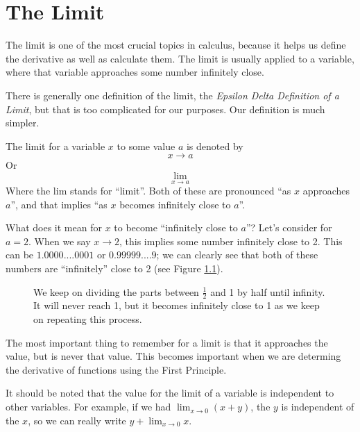 \documentclass[working]{tuftebook}
\begin{document}
\chapter{The Limit}
\vspace{-2em}
The limit is one of the most crucial topics in calculus, because it helps us define the derivative as well as calculate them. The limit is usually applied to a variable, where that variable approaches some number infinitely close.

There is generally one definition of the limit, the \emph{Epsilon Delta Definition of a Limit}, but that is too complicated for our purposes. Our definition is much simpler.

\begin{definition}
    The limit for a variable $x$ to some value $a$ is denoted by 
    \[
        x\to a
    \]
    Or
    \[
        \lim_{x\to a}
    \]
    Where the lim stands for ``limit''. Both of these are pronounced ``as $x$ approaches $a$'', and that implies ``as $x$ becomes infinitely close to $a$''.
\end{definition}

What does it mean for $x$ to become ``infinitely close to $a$''? Let's consider for $a=2$. When we say $x\to 2$, this implies some number infinitely close to 2. This can be $1.0000....0001$ or $0.99999....9$; we can clearly see that both of these numbers are ``infinitely'' close to 2 (see Figure \ref{fig:infinitely-close}).  

\begin{figure}[ht]
    \centering
    \caption{We keep on dividing the parts between $ \frac{1}{2}$ and 1 by half until infinity. It will never reach 1, but it becomes infinitely close to 1 as we keep on repeating this process.}
    \label{fig:infinitely-close}
\end{figure}

The most important thing to remember for a limit is that it approaches the value, but is never that value. This becomes important when we are determing the derivative of functions using the First Principle.

It should be noted that the value for the limit of a variable is independent to other variables. For example, if we had $\displaystyle \lim_{x\to 0}(x+y)$, the $y$ is independent of the $x$, so we can really write $\displaystyle y+\lim_{x\to 0}x$.
\end{document}
